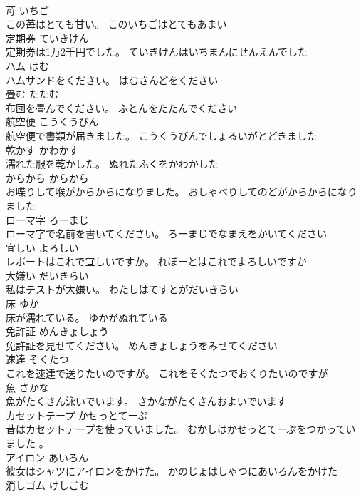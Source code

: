 \documentclass[8pt]{extreport}
\begin{document}
\begin{CJK}{UTF8}{min}
\\	苺	いちご	
\\	この苺はとても甘い。	このいちごはとてもあまい	
\\	定期券	ていきけん	
\\	定期券は1万2千円でした。	ていきけんはいちまんにせんえんでした	
\\	ハム	はむ	
\\	ハムサンドをください。	はむさんどをください	
\\	畳む	たたむ	
\\	布団を畳んでください。	ふとんをたたんでください	
\\	航空便	こうくうびん	
\\	航空便で書類が届きました。	こうくうびんでしょるいがとどきました	
\\	乾かす	かわかす	
\\	濡れた服を乾かした。	ぬれたふくをかわかした	
\\	からから	からから	
\\	お喋りして喉がからからになりました。	おしゃべりしてのどがからからになりました	
\\	ローマ字	ろーまじ	
\\	ローマ字で名前を書いてください。	ろーまじでなまえをかいてください	
\\	宜しい	よろしい	
\\	レポートはこれで宜しいですか。	れぽーとはこれでよろしいですか	
\\	大嫌い	だいきらい	
\\	私はテストが大嫌い。	わたしはてすとがだいきらい	
\\	床	ゆか	
\\	床が濡れている。	ゆかがぬれている	
\\	免許証	めんきょしょう	
\\	免許証を見せてください。	めんきょしょうをみせてください	
\\	速達	そくたつ	
\\	これを速達で送りたいのですが。	これをそくたつでおくりたいのですが	
\\	魚	さかな	
\\	魚がたくさん泳いでいます。	さかながたくさんおよいでいます	
\\	カセットテープ	かせっとてーぷ	
\\	昔はカセットテープを使っていました。	むかしはかせっとてーぷをつかっていました 。	
\\	アイロン	あいろん	
\\	彼女はシャツにアイロンをかけた。	かのじょはしゃつにあいろんをかけた	
\\	消しゴム	けしごむ	

\end{CJK}
\end{document}
